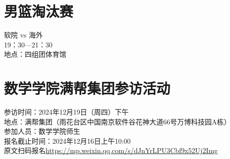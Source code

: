 \documentclass[letterpaper, 12pt]{article}
\begin{document}
\begin{multicols}{2}
\section{男篮淘汰赛}
软院 vs 海外\\
19：30—21：30\\
地点：四组团体育馆\\
\section{数学学院满帮集团参访活动}
参访时间：2024年12月19日（周四）下午\\
地点：满帮集团（雨花台区中国南京软件谷花神大道66号万博科技园A栋）\\
参加人员：数学学院师生\\
报名截止时间：2024年12月16日上午10:00\\
原文扫码报名\url{https://mp.weixin.qq.com/s/dJnYrLPU3Cbf9x52Uj2Img}
\end{multicols} 
\end{document}
